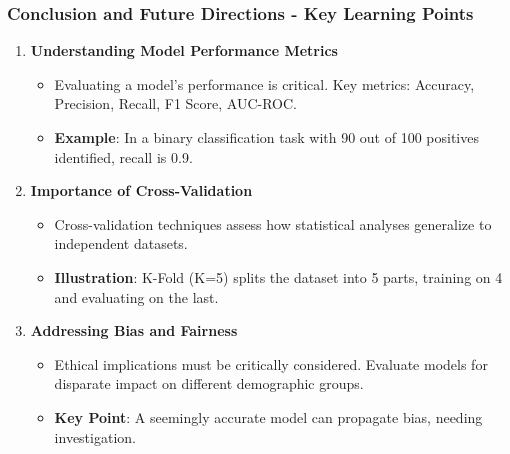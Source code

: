 \documentclass[aspectratio=169]{beamer}
\begin{document}
\begin{frame}[fragile]
    \frametitle{Conclusion and Future Directions - Key Learning Points}
    \begin{enumerate}
        \item \textbf{Understanding Model Performance Metrics}
        \begin{itemize}
            \item Evaluating a model’s performance is critical. Key metrics: Accuracy, Precision, Recall, F1 Score, AUC-ROC.
            \item \textbf{Example}: In a binary classification task with 90 out of 100 positives identified, recall is 0.9.
        \end{itemize}
        
        \item \textbf{Importance of Cross-Validation}
        \begin{itemize}
            \item Cross-validation techniques assess how statistical analyses generalize to independent datasets.
            \item \textbf{Illustration}: K-Fold (K=5) splits the dataset into 5 parts, training on 4 and evaluating on the last.
        \end{itemize}
        
        \item \textbf{Addressing Bias and Fairness}
        \begin{itemize}
            \item Ethical implications must be critically considered. Evaluate models for disparate impact on different demographic groups.
            \item \textbf{Key Point}: A seemingly accurate model can propagate bias, needing investigation.
        \end{itemize}
    \end{enumerate}
\end{frame}
\end{document}
